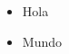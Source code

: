 \documentclass{article}
\begin{document}
\begin{itemize}
\item Hola
\item Mundo
  
\end{itemize}
\end{document}
